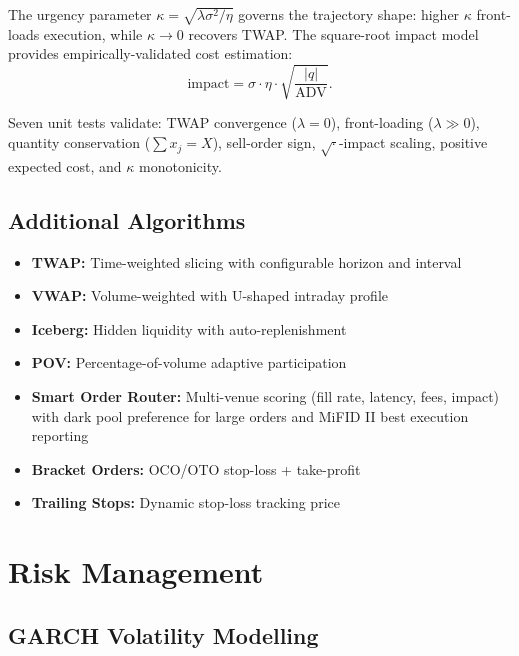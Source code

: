 \documentclass[11pt]{article}
\theoremstyle{definition}
\begin{document}
The urgency parameter $\kappa = \sqrt{\lambda\sigma^2/\eta}$ governs
the trajectory shape: higher $\kappa$ front-loads execution, while
$\kappa \to 0$ recovers TWAP. The square-root impact model provides
empirically-validated cost estimation:
\begin{equation}
  \text{impact} = \sigma \cdot \eta \cdot
  \sqrt{\frac{|q|}{\text{ADV}}}.
  \label{eq:sqrt-impact}
\end{equation}

Seven unit tests validate: TWAP convergence ($\lambda = 0$),
front-loading ($\lambda \gg 0$), quantity conservation
($\sum x_j = X$), sell-order sign, $\sqrt{\cdot}$-impact
scaling, positive expected cost, and $\kappa$ monotonicity.

\subsection{Additional Algorithms}

\begin{itemize}[leftmargin=*,topsep=2pt,itemsep=1pt]
  \item \textbf{TWAP:} Time-weighted slicing with configurable
        horizon and interval
  \item \textbf{VWAP:} Volume-weighted with U-shaped intraday profile
  \item \textbf{Iceberg:} Hidden liquidity with auto-replenishment
  \item \textbf{POV:} Percentage-of-volume adaptive participation
  \item \textbf{Smart Order Router:} Multi-venue scoring (fill rate,
        latency, fees, impact) with dark pool preference for large
        orders and MiFID II best execution reporting
  \item \textbf{Bracket Orders:} OCO/OTO stop-loss + take-profit
  \item \textbf{Trailing Stops:} Dynamic stop-loss tracking price
\end{itemize}

\section{Risk Management}
\label{sec:risk}

\subsection{GARCH Volatility Modelling}
\end{document}
